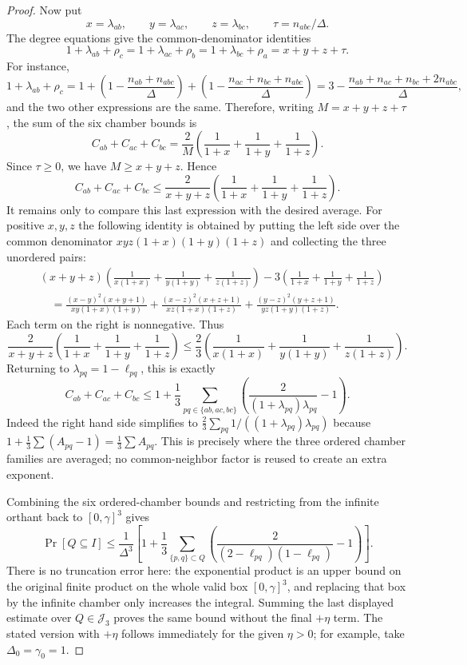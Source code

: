 \begin{proof}
Now put
\[
x=\lambda_{ab},\qquad y=\lambda_{ac},\qquad z=\lambda_{bc},\qquad
\tau=n_{abc}/\Delta .
\]
The degree equations give the common-denominator identities
\[
1+\lambda_{ab}+\rho_c
=1+\lambda_{ac}+\rho_b
=1+\lambda_{bc}+\rho_a
=x+y+z+\tau .
\]
For instance,
\[
1+\lambda_{ab}+\rho_c
=1+\left(1-\frac{n_{ab}+n_{abc}}{\Delta}\right)
  +\left(1-\frac{n_{ac}+n_{bc}+n_{abc}}{\Delta}\right)
=3-\frac{n_{ab}+n_{ac}+n_{bc}+2n_{abc}}{\Delta},
\]
and the two other expressions are the same.  Therefore, writing
$M=x+y+z+\tau$, the sum of the six chamber bounds is
\[
C_{ab}+C_{ac}+C_{bc}
=\frac2M\left(\frac1{1+x}+\frac1{1+y}+\frac1{1+z}\right).
\]
Since $\tau\ge0$, we have $M\ge x+y+z$.  Hence
\[
C_{ab}+C_{ac}+C_{bc}
\le
\frac2{x+y+z}\left(\frac1{1+x}+\frac1{1+y}+\frac1{1+z}\right).
\]
It remains only to compare this last expression with the desired average.
For positive $x,y,z$ the following identity is obtained by putting the left
side over the common denominator
$xy z(1+x)(1+y)(1+z)$ and collecting the three unordered pairs:
\[
\begin{aligned}
&(x+y+z)\left(\frac1{x(1+x)}+\frac1{y(1+y)}
  +\frac1{z(1+z)}\right)
-3\left(\frac1{1+x}+\frac1{1+y}+\frac1{1+z}\right)\\
&\quad =
\frac{(x-y)^2(x+y+1)}{xy(1+x)(1+y)}
+\frac{(x-z)^2(x+z+1)}{xz(1+x)(1+z)}
+\frac{(y-z)^2(y+z+1)}{yz(1+y)(1+z)} .
\end{aligned}
\]
Each term on the right is nonnegative.  Thus
\[
\frac2{x+y+z}\left(\frac1{1+x}+\frac1{1+y}+\frac1{1+z}\right)
\le
\frac23\left(\frac1{x(1+x)}+\frac1{y(1+y)}+\frac1{z(1+z)}\right).
\]
Returning to $\lambda_{pq}=1-\ell_{pq}$, this is exactly
\[
C_{ab}+C_{ac}+C_{bc}
\le
1+\frac13\sum_{pq\in\{ab,ac,bc\}}
\left(\frac{2}{(1+\lambda_{pq})\lambda_{pq}}-1\right).
\]
Indeed the right hand side simplifies to
$\frac23\sum_{pq}1/((1+\lambda_{pq})\lambda_{pq})$ because
$1+\frac13\sum(A_{pq}-1)=\frac13\sum A_{pq}$.
This is precisely where the three ordered chamber families are averaged; no
common-neighbor factor is reused to create an extra exponent.

Combining the six ordered-chamber bounds and restricting from the infinite
orthant back to $[0,\gamma]^3$ gives
\[
\Pr[Q\subseteq I]
\le
\frac1{\Delta^3}
\left[
1+\frac13\sum_{\{p,q\}\subset Q}
\left(\frac{2}{(2-\ell_{pq})(1-\ell_{pq})}-1\right)
\right].
\]
There is no truncation error here: the exponential product is an upper bound
on the original finite product on the whole valid box $[0,\gamma]^3$, and
replacing that box by the infinite chamber only increases the integral.
Summing the last displayed estimate over $Q\in\mathcal J_3$ proves the same
bound without the final $+\eta$ term.  The stated version with $+\eta$ follows
immediately for the given $\eta>0$; for example, take
$\Delta_0=\gamma_0=1$.
\end{proof}
